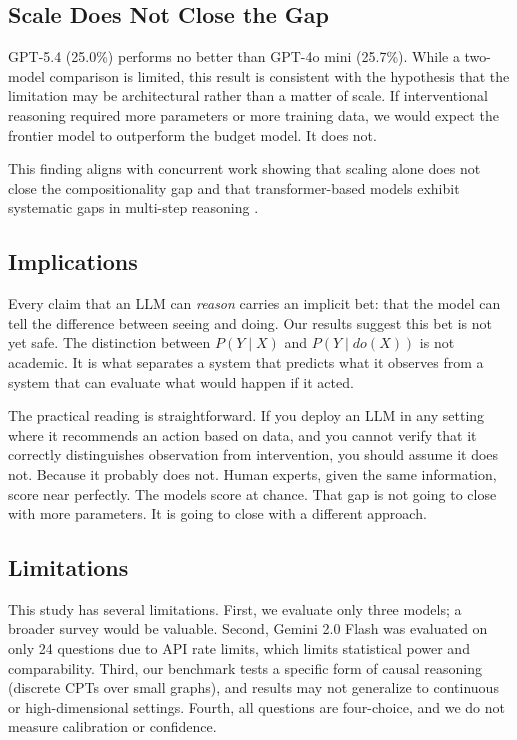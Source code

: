 \documentclass[11pt,a4paper]{article}
\begin{document}
\subsection{Scale Does Not Close the Gap}

GPT-5.4 (25.0\%) performs no better than GPT-4o mini (25.7\%). While a two-model comparison is limited, this result is consistent with the hypothesis that the limitation may be architectural rather than a matter of scale. If interventional reasoning required more parameters or more training data, we would expect the frontier model to outperform the budget model. It does not.

This finding aligns with concurrent work showing that scaling alone does not close the compositionality gap \cite{press2022scaling} and that transformer-based models exhibit systematic gaps in multi-step reasoning \cite{zhao2024mathtrap}.

\subsection{Implications}

Every claim that an LLM can \textit{reason} carries an implicit bet: that the model can tell the difference between seeing and doing. Our results suggest this bet is not yet safe. The distinction between $P(Y \mid X)$ and $P(Y \mid do(X))$ is not academic. It is what separates a system that predicts what it observes from a system that can evaluate what would happen if it acted.

The practical reading is straightforward. If you deploy an LLM in any setting where it recommends an action based on data, and you cannot verify that it correctly distinguishes observation from intervention, you should assume it does not. Because it probably does not. Human experts, given the same information, score near perfectly. The models score at chance. That gap is not going to close with more parameters. It is going to close with a different approach.

\subsection{Limitations}

This study has several limitations. First, we evaluate only three models; a broader survey would be valuable. Second, Gemini 2.0 Flash was evaluated on only 24 questions due to API rate limits, which limits statistical power and comparability. Third, our benchmark tests a specific form of causal reasoning (discrete CPTs over small graphs), and results may not generalize to continuous or high-dimensional settings. Fourth, all questions are four-choice, and we do not measure calibration or confidence.
\end{document}

